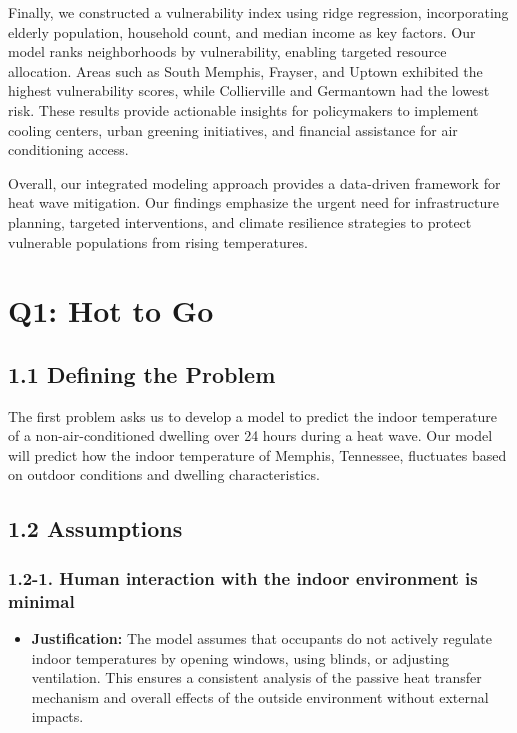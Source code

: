 \documentclass{article}
\begin{document}
Finally, we constructed a vulnerability index using ridge regression, incorporating elderly population, household count, and median income as key factors. Our model ranks neighborhoods by vulnerability, enabling targeted resource allocation. Areas such as South Memphis, Frayser, and Uptown exhibited the highest vulnerability scores, while Collierville and Germantown had the lowest risk. These results provide actionable insights for policymakers to implement cooling centers, urban greening initiatives, and financial assistance for air conditioning access.

Overall, our integrated modeling approach provides a data-driven framework for heat wave mitigation. Our findings emphasize the urgent need for infrastructure planning, targeted interventions, and climate resilience strategies to protect vulnerable populations from rising temperatures.

\clearpage

\section*{$\mathbf{Q1}$: Hot to Go}
\subsection*{1.1 Defining the Problem}
The first problem asks us to develop a model to predict the indoor temperature of a non-air-conditioned dwelling over 24 hours during a heat wave. Our model will predict how the indoor temperature of Memphis, Tennessee, fluctuates based on outdoor conditions and dwelling characteristics.

\subsection*{1.2 Assumptions}
\subsubsection*{1.2-1. Human interaction with the indoor environment is minimal}
\begin{itemize}
    \item \textbf{Justification:} The model assumes that occupants do not actively regulate indoor temperatures by opening windows, using blinds, or adjusting ventilation. This ensures a consistent analysis of the passive heat transfer mechanism and overall effects of the outside environment without external impacts.
\end{itemize}
\end{document}
